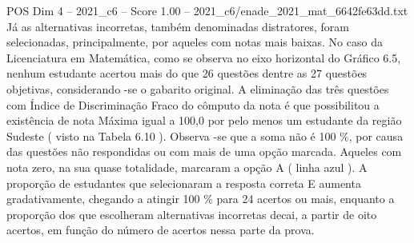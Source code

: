 \begin{textsample}{POS Dim 4 – 2021\_c6 – Score 1.00 – 2021\_c6/enade\_2021\_mat\_6642fe63dd.txt}
Já as alternativas incorretas, também denominadas distratores, foram selecionadas, principalmente, por aqueles com notas mais baixas.
No caso da Licenciatura em Matemática, como se observa no eixo horizontal do Gráfico 6.5, nenhum estudante acertou mais do que 26 questões dentre as 27 questões objetivas, considerando -se o gabarito original.
A eliminação das três questões com Índice de Discriminação Fraco do cômputo da nota é que possibilitou a existência de nota Máxima igual a 100,0 por pelo menos um estudante da região Sudeste ( visto na Tabela 6.10 ).
Observa -se que a soma não é 100 \%, por causa das questões não respondidas ou com mais de uma opção marcada.
Aqueles com nota zero, na sua quase totalidade, marcaram a opção A ( linha azul ).
A proporção de estudantes que selecionaram a resposta correta E aumenta gradativamente, chegando a atingir 100 \% para 24 acertos ou mais, enquanto a proporção dos que escolheram alternativas incorretas decai, a partir de oito acertos, em função do número de acertos nessa parte da prova.

\end{textsample}
